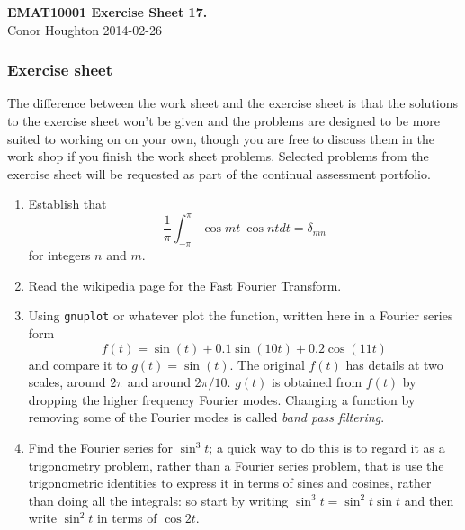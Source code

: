 \documentclass[12pt]{article}
\begin{document}
\begin{center}
{\bf EMAT10001 Exercise Sheet 17.}\\[1cm]{} Conor Houghton 2014-02-26
\end{center}


\subsubsection*{Exercise sheet}

The difference between the work sheet and the exercise sheet is that
the solutions to the exercise sheet won't be given and the problems
are designed to be more suited to working on on your own, though you
are free to discuss them in the work shop if you finish the work sheet
problems. Selected problems from the exercise sheet will be requested
as part of the continual assessment portfolio.

\begin{enumerate}


\item Establish that
\begin{equation}
\frac{1}{\pi}\int^\pi_{-\pi} \cos mt ~\cos nt dt=\delta_{mn}
\end{equation}
for integers $n$ and $m$.

\item Read the wikipedia page for the Fast Fourier Transform.

\item Using \texttt{gnuplot} or whatever plot the function, written here in a Fourier series form
\begin{equation}
f(t)=\sin(t)+0.1\sin(10t)+0.2\cos(11t)
\end{equation}
and compare it to $g(t)=\sin(t)$. The original $f(t)$ has details at
two scales, around $2\pi$ and around $2\pi/10$. $g(t)$ is obtained
from $f(t)$ by dropping the higher frequency Fourier modes. Changing a
function by removing some of the Fourier modes is called \textsl{band
  pass filtering}.

\item Find the Fourier series for $\sin^3 t$; a quick way to do this is to regard it as a trigonometry problem, rather than a Fourier series problem, that is use the trigonometric identities to express it in terms of sines and cosines, rather than doing all the integrals: so start by writing $\sin^3 t=\sin^2 t \sin t$ and then write $\sin^2 t$ in terms of $\cos 2t$.


\end{enumerate}
\end{document}
